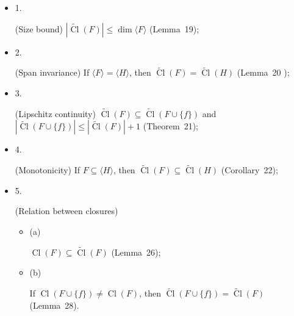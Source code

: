 \begin{itemize}


\item 
1. 


(Size bound) $|\widetilde{\mathop{\mathrm{Cl}}}(F)|\leq\dim\langle F\rangle$ (Lemma 19);\par





\item 
2. 


(Span invariance) If $\langle F\rangle=\langle H\rangle$, then $\widetilde{\mathop{\mathrm{Cl}}}(F)=\widetilde{\mathop{\mathrm{Cl}}}(H)$ (Lemma 20 );\par





\item 
3. 


(Lipschitz continuity) $\widetilde{\mathop{\mathrm{Cl}}}(F)\subseteq\widetilde{\mathop{\mathrm{Cl}}}(F\cup\{f\})$ and $|\widetilde{\mathop{\mathrm{Cl}}}(F\cup\{f\})|\leq|\widetilde{\mathop{\mathrm{Cl}}}(F)|+1$ (Theorem 21);\par





\item 
4. 


(Monotonicity) If $F\subseteq\langle H\rangle$, then $\widetilde{\mathop{\mathrm{Cl}}}(F)\subseteq\widetilde{\mathop{\mathrm{Cl}}}(H)$ (Corollary 22);\par





\item 
5. 


(Relation between closures)\par


\begin{itemize}


\item 
(a) 


$\mathop{\mathrm{Cl}}(F)\subseteq\widetilde{\mathop{\mathrm{Cl}}}(F)$ (Lemma 26);\par





\item 
(b) 


If $\mathop{\mathrm{Cl}}(F\cup\{f\})\neq\mathop{\mathrm{Cl}}(F)$, then
$\widetilde{\mathop{\mathrm{Cl}}}(F\cup\{f\})=\widetilde{\mathop{\mathrm{Cl}}}(F)$ (Lemma 28).\par





\end{itemize}





\end{itemize}




